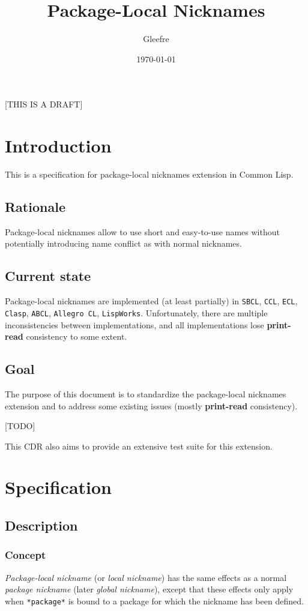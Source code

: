 \documentclass[11pt]{article}
\author{Gleefre}
\date{\today}
\title{Package-Local Nicknames}
\begin{document}
\maketitle
\tableofcontents

[THIS IS A DRAFT]

\section{Introduction}
\label{sec:org1d851e7}
This is a specification for package-local nicknames extension in Common Lisp.
\subsection{Rationale}
\label{sec:org38fba50}
Package-local nicknames allow to use short and easy-to-use names without
potentially introducing name conflict as with normal nicknames.
\subsection{Current state}
\label{sec:orge5bd429}
Package-local nicknames are implemented (at least partially) in \texttt{SBCL},
\texttt{CCL}, \texttt{ECL}, \texttt{Clasp}, \texttt{ABCL}, \texttt{Allegro CL}, \texttt{LispWorks}. Unfortunately,
there are multiple inconsistencies between implementations, and all
implementations lose \textbf{print-read} consistency to some extent.
\subsection{Goal}
\label{sec:org833c289}
The purpose of this document is to standardize the package-local nicknames
extension and to address some existing issues (mostly \textbf{print-read}
consistency).

[TODO]

This CDR also aims to provide an extensive test suite for this extension.
\section{Specification}
\label{sec:org9148a74}
\subsection{Description}
\label{sec:org5cef6ff}
\subsubsection{Concept}
\label{sec:org5bf7e90}
\emph{Package-local nickname} (or \emph{local nickname}) has the same effects as a
normal \emph{package nickname} (later \emph{global nickname}), except that these
effects only apply when \texttt{*package*} is bound to a package for which the
nickname has been defined.
\end{document}
